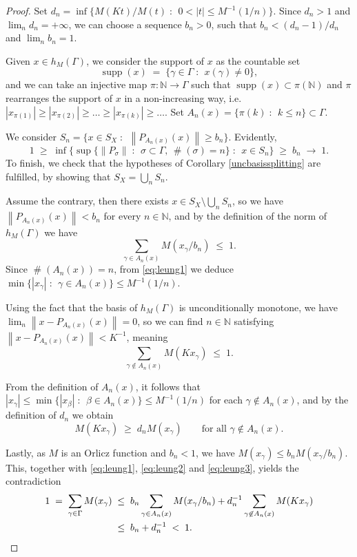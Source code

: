 \documentclass[12pt,a4paper]{amsart}
\theoremstyle{definition}
\theoremstyle{remark}
\DeclareMathOperator{\card}{\#}
\DeclareMathOperator{\supp}{supp}
\newcommand{\n}[1]{\ensuremath{\left\|{#1}\right\|}}
\newcommand{\N}{\mathbb{N}}
\newcommand{\set}[2]{\{{#1} \;:\;\, {#2}\}}
\begin{document}
\begin{proof}
Set $d_n=\inf\set{M(Kt)/M(t)}{0<|t| \leq M^{-1}(1/n)}$. Since $d_n>1$
and $\lim_n d_n=+\infty$, we can choose a sequence $b_n > 0$, such that
$b_n <(d_n-1)/d_n$ and $\lim_n b_n=1$.

Given $x \in h_M(\Gamma)$, we consider the support of $x$ as the
countable set
\[
\supp(x) \;=\; \set{\gamma\in \Gamma}{x(\gamma)\neq 0},
\]
and we can take an injective map $\pi:\N\to\Gamma$ such that
$\supp(x)\subset \pi(\N)$ and $\pi$ rearranges the support of $x$ in
a non-increasing way, i.e.\
$|x_{\pi(1)}|\geq|x_{\pi(2)}|\geq\dots\geq|x_{\pi(k)}|\geq\dots$.
Set $A_n(x)=\set{\pi(k)}{k\leq n}\subset\Gamma$.

We consider $S_n=\set{x\in S_X}{\n{P_{A_n(x)}(x)} \geq b_n}$. Evidently,
\[
1 \;\geq\; \inf\set{\sup\set{\n{P_\sigma}}{\sigma\subset\Gamma,\, \card(\sigma) = n}}{x\in S_n} \;\geq\; b_n \;\to\; 1.
\]
To finish, we check that the hypotheses of Corollary
\ref{uncbasissplitting} are fulfilled, by showing that $S_X =
\bigcup_n S_n$.

Assume the contrary, then there exists $x\in S_X\setminus \bigcup_n
S_n$, so we have $\n{P_{A_n(x)}(x)} < b_n$ for every $n\in\N$, and
by the definition of the norm of $h_M(\Gamma)$ we have
\begin{equation}
\label{eq:leung1} \sum_{\gamma\in A_{n}(x)} M(x_\gamma/b_n) \;\leq\; 1.
\end{equation}
Since $\card(A_n(x)) = n$, from \eqref{eq:leung1} we deduce
$\min\set{|x_{\gamma}|}{\gamma\in A_n(x)}\leq M^{-1}(1/n)$.

Using the fact that the basis of $h_M(\Gamma)$ is unconditionally
monotone, we have $\lim_n\n{x - P_{A_n(x)}(x)}=0$, so we can find $n
\in \N$ satisfying $\n{x - P_{A_n(x)}(x)}<K^{-1}$, meaning
\begin{equation}
\label{eq:leung2} \sum_{\gamma\not\in A_{n}(x)} M(Kx_\gamma) \;\leq\; 1.
\end{equation}

From the definition of $A_n(x)$, it follows that $|x_{\gamma}| \leq
\min\set{|x_{\beta}|}{\beta \in A_n(x)}\leq M^{-1}(1/n)$ for each
$\gamma \not\in A_n(x)$, and by the definition of $d_n$ we obtain
\begin{equation}
\label{eq:leung3} M(K x_\gamma) \;\geq\; d_n M(x_\gamma) \qquad\text{for all } \gamma\not\in A_{n}(x).
\end{equation}

Lastly, as $M$ is an Orlicz function and $b_n <1$, we have
$M(x_\gamma)\leq b_n M(x_\gamma/b_n)$. This, together with \eqref{eq:leung1},
\eqref{eq:leung2} and \eqref{eq:leung3}, yields the contradiction
\begin{align*}
1 \;=\; \sum_{\gamma\in \Gamma}M(x_\gamma)
&\;\leq\; b_n \sum_{\gamma\in A_n(x)} M(x_\gamma/b_n) + d_n^{-1}\sum_{\gamma\not\in A_n(x)} M(Kx_\gamma)\\
&\;\leq\; b_n + d_n^{-1} \;<\; 1. \qedhere
\end{align*}
\end{proof}
\end{document}

